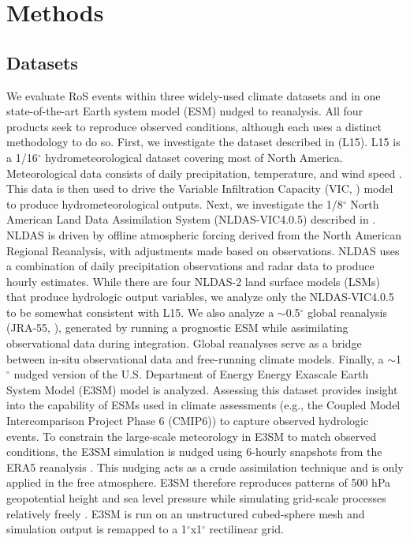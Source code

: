\documentclass[draft]{agujournal2019}
\newcommand{\degree}{$^{\circ}$}
\begin{document}

\section{Methods}

\subsection{Datasets}

We evaluate RoS events within three widely-used climate datasets and in one state-of-the-art Earth system model (ESM) nudged to reanalysis. All four products seek to reproduce observed conditions, although each uses a distinct methodology to do so. 
First, we investigate the dataset described in \citet{livneh2015spatially} (L15). 
L15 is a 1/16\degree{} hydrometeorological dataset covering most of North America. 
Meteorological data consists of daily precipitation, temperature, and wind speed \citep{henn2018an}. 
This data is then used to drive the Variable Infiltration Capacity (VIC, \citet{liang1994simple}) model to produce hydrometeorological outputs. 
Next, we investigate the 1/8\degree{} North American Land Data Assimilation System (NLDAS-VIC4.0.5)  described in \citet{xia2012continental1}. 
NLDAS is driven by offline atmospheric forcing derived from the North American Regional Reanalysis, with adjustments made based on observations. 
NLDAS uses a combination of daily precipitation observations and radar data to produce hourly estimates. 
While there are four NLDAS-2 land surface models (LSMs) that produce hydrologic output variables, we analyze only the NLDAS-VIC4.0.5 to be somewhat consistent with L15.
We also analyze a $\sim$0.5\degree{} global reanalysis (JRA-55, \citet{kobayashi2015jra55}), generated by running a prognostic ESM while assimilating observational data during integration. 
Global reanalyses serve as a bridge between in-situ observational data and free-running climate models. 
Finally, a $\sim$1\degree{} nudged version of the U.S. Department of Energy Energy Exascale Earth System Model (E3SM) model is analyzed. Assessing this dataset provides insight into the capability of ESMs used in climate assessments (e.g., the Coupled Model Intercomparison Project Phase 6 (CMIP6)) to capture observed hydrologic events.
To constrain the large-scale meteorology in E3SM to match observed conditions, the E3SM simulation is nudged using 6-hourly snapshots from the ERA5 reanalysis \citep{hersbach2020era5}.
This nudging acts as a crude assimilation technique and is only applied in the free atmosphere. E3SM therefore reproduces patterns of 500 hPa geopotential height and sea level pressure while simulating grid-scale processes relatively freely \citep{sun2019impact}. 
E3SM is run on an unstructured cubed-sphere mesh and simulation output is remapped to a 1\degree{}x1\degree{} rectilinear grid.
\end{document}
